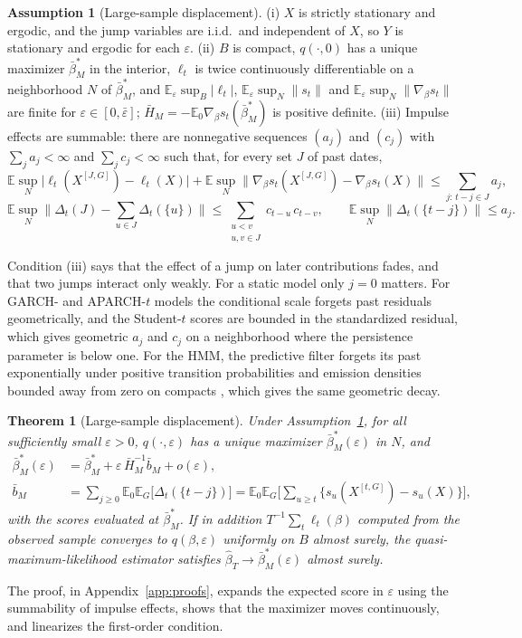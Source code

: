 \documentclass[11pt,a4paper]{article}
\newtheorem{theorem}{Theorem}
\theoremstyle{definition}
\newtheorem{assumption}{Assumption}
\theoremstyle{remark}
\newcommand{\E}{\mathbb{E}}
\begin{document}
\begin{assumption}[Large-sample displacement]\label{A:largeT}
(i) $X$ is strictly stationary and ergodic, and the jump variables are i.i.d.\ and independent of $X$, so $Y$ is stationary and ergodic for each $\varepsilon$. (ii) $B$ is compact, $q(\cdot,0)$ has a unique maximizer $\bar\beta^*_M$ in the interior, $\ell_t$ is twice continuously differentiable on a neighborhood $N$ of $\bar\beta^*_M$, and $\E_\varepsilon\sup_B|\ell_t|$, $\E_\varepsilon\sup_N\|s_t\|$ and $\E_\varepsilon\sup_N\|\nabla_\beta s_t\|$ are finite for $\varepsilon\in[0,\bar\varepsilon]$; $\bar H_M=-\E_0\nabla_\beta s_t(\bar\beta^*_M)$ is positive definite. (iii) Impulse effects are summable: there are nonnegative sequences $(a_j)$ and $(c_j)$ with $\sum_ja_j<\infty$ and $\sum_jc_j<\infty$ such that, for every set $J$ of past dates,
\[
\E\sup_N\big|\ell_t(X^{[J,G]})-\ell_t(X)\big|+\E\sup_N\big\|\nabla_\beta s_t(X^{[J,G]})-\nabla_\beta s_t(X)\big\|\le\sum_{j:\,t-j\in J}a_j,
\]
\[
\E\sup_N\Big\|\Delta_t(J)-\sum_{u\in J}\Delta_t(\{u\})\Big\|\le\sum_{\substack{u<v\\u,v\in J}}c_{t-u}\,c_{t-v},\qquad \E\sup_N\|\Delta_t(\{t-j\})\|\le a_j .
\]
\end{assumption}
\noindent Condition (iii) says that the effect of a jump on later contributions fades, and that two jumps interact only weakly. For a static model only $j=0$ matters. For GARCH- and APARCH-$t$ models the conditional scale forgets past residuals geometrically, and the Student-$t$ scores are bounded in the standardized residual, which gives geometric $a_j$ and $c_j$ on a neighborhood where the persistence parameter is below one. For the HMM, the predictive filter forgets its past exponentially under positive transition probabilities and emission densities bounded away from zero on compacts \citep{legland2000,douc2004}, which gives the same geometric decay.

\begin{theorem}[Large-sample displacement]\label{thm:largeT}
Under Assumption~\ref{A:largeT}, for all sufficiently small $\varepsilon>0$, $q(\cdot,\varepsilon)$ has a unique maximizer $\bar\beta^*_M(\varepsilon)$ in $N$, and
\[
\begin{aligned}
\bar\beta^*_M(\varepsilon)&=\bar\beta^*_M+\varepsilon\,\bar H_M^{-1}\bar b_M+o(\varepsilon),\\
\bar b_M&=\sum_{j\ge0}\E_0\E_G\big[\Delta_t(\{t-j\})\big]=\E_0\E_G\Big[\sum_{u\ge t}\big\{s_u(X^{[t,G]})-s_u(X)\big\}\Big],
\end{aligned}
\]
with the scores evaluated at $\bar\beta^*_M$. If in addition $T^{-1}\sum_t\ell_t(\beta)$ computed from the observed sample converges to $q(\beta,\varepsilon)$ uniformly on $B$ almost surely, the quasi-maximum-likelihood estimator satisfies $\hat\beta_T\to\bar\beta^*_M(\varepsilon)$ almost surely.
\end{theorem}
\noindent The proof, in Appendix~\ref{app:proofs}, expands the expected score in $\varepsilon$ using the summability of impulse effects, shows that the maximizer moves continuously, and linearizes the first-order condition.
\end{document}
